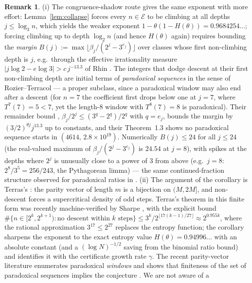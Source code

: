 \documentclass[11pt]{article}
\theoremstyle{definition}
\newtheorem{remark}[theorem]{Remark}
\begin{document}
\begin{remark}\label{rem:countnum}
(i) The congruence-shadow route gives the same exponent with more effort:
Lemma~\ref{lem:collapse} forces every $n\in\mathcal{E}$ to be climbing at
all depths $j\le\log_3 n$, which yields the weaker exponent
$1-\theta(1-H(\theta))=0.9684254\ldots$; forcing climbing up to depth
$\log_2 n$ (and hence $H(\theta)$ again) requires bounding the
\emph{margin} $B(j):=\max\lfloor\beta_j/(2^j-3^{e_j})\rfloor$ over classes
whose first non-climbing depth is $j$, e.g.\ through the effective
irrationality measure $|j\log 2-e\log 3|>c\,j^{-13.3}$ of Rhin
\cite{Rhin1987}. The integers that dodge descent at their first
non-climbing depth are initial terms of \emph{paradoxical sequences} in
the sense of Rozier--Terracol \cite{RozierTerracol2026} --- a proper
subclass, since a paradoxical window may also end after a descent (for
$n=7$ the coefficient first drops below one at $j=7$, where $T^7(7)=5<7$,
yet the length-$8$ window with $T^8(7)=8$ is paradoxical). Their
remainder bound \cite[Thm.~2.4]{RozierTerracol2026},
$\beta_j/2^j\le(3^{q}-2^{q})/2^{q}$ with $q=e_j$, bounds the margin by
$(3/2)^{\theta j}j^{13.3}$ up to constants, and their Theorem~1.3 shows
no paradoxical sequence starts in $(4614,\,2.8\times 10^{19})$.
Numerically $B(j)\le 24$ for all $j\le 24$ (the real-valued maximum of
$\beta_j/(2^j-3^{e_j})$ is $24.54$ at $j=8$), with spikes at the depths
where $2^j$ is unusually close to a power of $3$ from above (e.g.\
$j=8$: $2^8/3^5=256/243$, the Pythagorean limma) --- the same
continued-fraction structure observed for paradoxical ratios in
\cite{Niu2026}. (ii) The argument of the corollary is Terras's \cite{Terras1976}: the
parity vector of length $m$ is a bijection on $(M,2M]$, and non-descent
forces a supercritical density of odd steps. Terras's theorem in this
finite form was recently machine-verified by Sharpe \cite{Sharpe2026},
with the explicit bound
$\#\{n\in[2^k,2^{k+1}):\text{no descent within } k \text{ steps}\}
\le 3^k/2^{\lfloor 17(k-1)/27\rfloor}\approx 2^{0.955k}$, where the
rational approximation $3^{17}\le 2^{27}$ replaces the entropy function;
the corollary sharpens the exponent to the exact entropy value
$H(\theta)=0.94996\ldots$ with an absolute constant (and a
$(\log N)^{-1/2}$ saving from the binomial ratio bound) and identifies
it with the certificate growth rate $\gamma$. The recent parity-vector
literature enumerates paradoxical \emph{windows} \cite{Niu2026} and shows
that finiteness of the set of paradoxical sequences implies the
conjecture \cite[Cor.~3.3]{RozierTerracol2026}. We are not aware of a

\end{remark}
\end{document}
